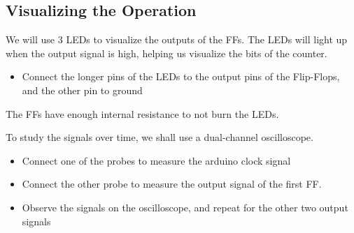 \documentclass[a4paper,12pt]{article}
\begin{document}
\subsection{Visualizing the Operation}
We will use 3 LEDs to visualize the outputs of the FFs. The LEDs will light up when the output signal is high, helping us visualize the bits of the counter.
\begin{itemize}
    \item Connect the longer pins of the LEDs to the output pins of the Flip-Flops, and the other pin to ground
\end{itemize}
The FFs have enough internal resistance to not burn the LEDs.

To study the signals over time, we shall use a dual-channel oscilloscope.
\begin{itemize}
    \item Connect one of the probes to measure the arduino clock signal
    \item Connect the other probe to measure the output signal of the first FF.
    \item Observe the signals on the oscilloscope, and repeat for the other two output signals
\end{itemize}
\end{document}
